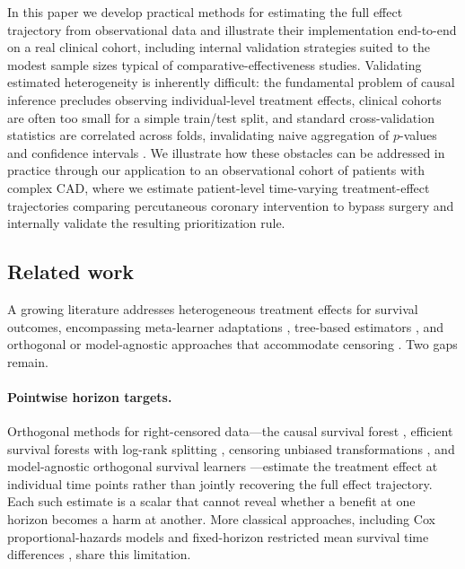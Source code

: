 \documentclass{article}
\begin{document}
In this paper we develop practical methods for estimating the full effect trajectory from observational data and illustrate their implementation end-to-end on a real clinical cohort, including internal validation strategies suited to the modest sample sizes typical of comparative-effectiveness studies.
Validating estimated heterogeneity is inherently difficult: the fundamental problem of causal inference precludes observing individual-level treatment effects, clinical cohorts are often too small for a simple train/test split, and standard cross-validation statistics are correlated across folds, invalidating naive aggregation of $p$-values and confidence intervals \citep{grf_rate_cv_vignette,bengio2004no}.
We illustrate how these obstacles can be addressed in practice through our application to an observational cohort of patients with complex CAD, where we estimate patient-level time-varying treatment-effect trajectories comparing percutaneous coronary intervention to bypass surgery and internally validate the resulting prioritization rule.

\subsection{Related work}\label{subsec:related}

A growing literature addresses heterogeneous treatment effects for survival outcomes, encompassing meta-learner adaptations \citep{curth2021survite,xu2023treatment}, tree-based estimators \citep{cui2023estimating,sverdrup2025efficient,bo2024estimating}, and orthogonal or model-agnostic approaches that accommodate censoring \citep{xu2024estimating,frauen2025orthogonal}.
Two gaps remain.

\paragraph{Pointwise horizon targets.}
Orthogonal methods for right-censored data---the causal survival forest \citep{cui2023estimating}, efficient survival forests with log-rank splitting \citep{sverdrup2025efficient}, censoring unbiased transformations \citep{xu2024estimating}, and model-agnostic orthogonal survival learners \citep{frauen2025orthogonal}---estimate the treatment effect at individual time points rather than jointly recovering the full effect trajectory.
Each such estimate is a scalar that cannot reveal whether a benefit at one horizon becomes a harm at another.
More classical approaches, including Cox proportional-hazards models \citep{cox1984} and fixed-horizon restricted mean survival time differences \citep{royston2013restricted}, share this limitation.
\end{document}
